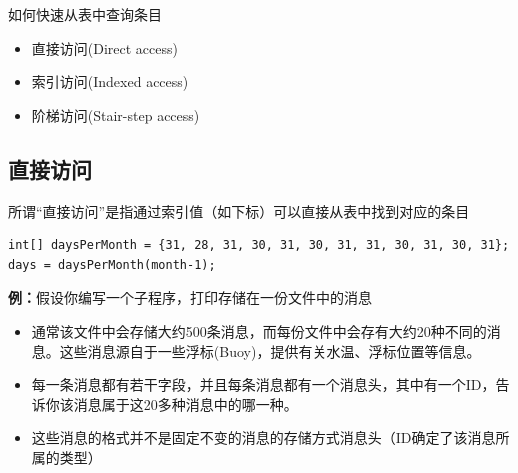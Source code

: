 如何快速从表中查询条目
\begin{itemize}
    \item 直接访问(Direct access)
    \item 索引访问(Indexed access)
    \item 阶梯访问(Stair-step access)
\end{itemize}

\subsection{直接访问}
所谓“直接访问”是指通过索引值（如下标）可以直接从表中找到对应的条目
\begin{lstlisting}
int[] daysPerMonth = {31, 28, 31, 30, 31, 30, 31, 31, 30, 31, 30, 31};
days = daysPerMonth(month-1);
\end{lstlisting}

\textbf{例：}假设你编写一个子程序，打印存储在一份文件中的消息
\begin{itemize}
    \item 通常该文件中会存储大约500条消息，而每份文件中会存有大约20种不同的消息。这些消息源自于一些浮标(Buoy)，提供有关水温、浮标位置等信息。
    \item 每一条消息都有若干字段，并且每条消息都有一个消息头，其中有一个ID，告诉你该消息属于这20多种消息中的哪一种。
    \item 这些消息的格式并不是固定不变的消息的存储方式消息头（ID确定了该消息所属的类型）
\end{itemize}

